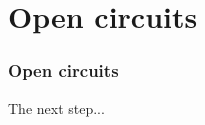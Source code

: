 \section{Open circuits}

\begin{frame}
    \frametitle{Open circuits}

    The next step...

\end{frame}